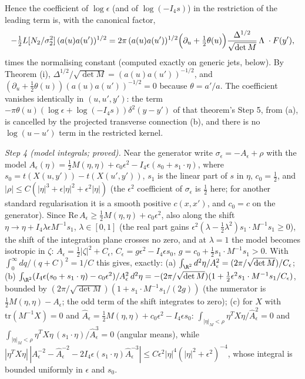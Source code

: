 Hence the coefficient of $\log\epsilon$ (and of $\log(-I_{4}s)$) in the restriction of the leading term is, with the canonical factor,
\[
-\tfrac12 L[N_{2}/\sigma_{2}^{2}]\,(a(u)a(u'))^{1/2} = 2\pi\,(a(u)a(u'))^{1/2}\Bigl(\partial_{u} + \tfrac12\theta(u)\Bigr)\frac{\Delta^{1/2}}{\sqrt{\det M}}\,\Lambda\;\cdot F(y'),
\]
times the normalising constant (computed exactly on generic jets, below). By Theorem (i), $\Delta^{1/2}/\sqrt{\det M} = (a(u)a(u'))^{-1/2}$, and $(\partial_{u} + \tfrac12\theta(u))(a(u)a(u'))^{-1/2} = 0$ because $\theta = a'/a$. The coefficient vanishes identically in $(u, u', y')$: the term $-\pi\theta(u)(\log\epsilon + \log(-I_{4}s))\delta^{2}(y - y')$ of that theorem's Step 5, from (a), is cancelled by the projected transverse connection (b), and there is no $\log(u - u')$ term in the restricted kernel.

\emph{Step 4 (model integrals; proved).} Near the generator write $\sigma_{\epsilon} = -A_{\epsilon} + \rho$ with the model $A_{\epsilon}(\eta) = \tfrac12 M(\eta, \eta) + c_{0}\epsilon^{2} - I_{4}\epsilon(s_{0} + s_{1}\cdot\eta)$, where $s_{0} = t(X(u, y')) - t(X(u', y'))$, $s_{1}$ is the linear part of $s$ in $\eta$, $c_{0} = \tfrac12$, and $|\rho| \le C(|\eta|^{3} + \epsilon|\eta|^{2} + \epsilon^{2}|\eta|)$ (the $\epsilon^{2}$ coefficient of $\sigma_{\epsilon}$ is $\tfrac12$ here; for another standard regularisation it is a smooth positive $c(x, x')$, and $c_{0} = c$ on the generator). Since $\mathrm{Re}\,A_{\epsilon} \ge \tfrac12 M(\eta, \eta) + c_{0}\epsilon^{2}$, also along the shift $\eta \to \eta + I_{4}\lambda\epsilon M^{-1}s_{1}$, $\lambda \in [0, 1]$ (the real part gains $\epsilon^{2}(\lambda - \tfrac12\lambda^{2})s_{1}\cdot M^{-1}s_{1} \ge 0$), the shift of the integration plane crosses no zero, and at $\lambda = 1$ the model becomes isotropic in $\zeta$: $A_{\epsilon} = \tfrac12|\zeta|^{2} + C_{\epsilon}$, $C_{\epsilon} = g\epsilon^{2} - I_{4}\epsilon s_{0}$, $g = c_{0} + \tfrac12 s_{1}\cdot M^{-1}s_{1} > 0$. With $\int_{0}^{\infty}dq/(q + C)^{2} = 1/C$ this gives, exactly:
(a) $\int_{\R^{2}}d^{2}\eta/A_{\epsilon}^{2} = (2\pi/\sqrt{\det M})/C_{\epsilon}$;
(b) $\int_{\R^{2}}(I_{4}\epsilon(s_{0} + s_{1}\cdot\eta) - c_{0}\epsilon^{2})/A_{\epsilon}^{2}\,d^{2}\eta = -(2\pi/\sqrt{\det M})(1 + \tfrac12\epsilon^{2}s_{1}\cdot M^{-1}s_{1}/C_{\epsilon})$, bounded by $(2\pi/\sqrt{\det M})(1 + s_{1}\cdot M^{-1}s_{1}/(2g))$ (the numerator is $\tfrac12 M(\eta, \eta) - A_{\epsilon}$; the odd term of the shift integrates to zero);
(c) for $X$ with $\mathrm{tr}(M^{-1}X) = 0$ and $\hat A_{\epsilon} = \tfrac12 M(\eta, \eta) + c_{0}\epsilon^{2} - I_{4}\epsilon s_{0}$: $\int_{|\eta|_{M} < \rho}\eta^{T}X\eta/\hat A_{\epsilon}^{2} = 0$ and $\int_{|\eta|_{M} < \rho}\eta^{T}X\eta\,(s_{1}\cdot\eta)/\hat A_{\epsilon}^{3} = 0$ (angular means), while $|\eta^{T}X\eta|\,|A_{\epsilon}^{-2} - \hat A_{\epsilon}^{-2} - 2I_{4}\epsilon(s_{1}\cdot\eta)\hat A_{\epsilon}^{-3}| \le C\epsilon^{2}|\eta|^{4}(|\eta|^{2} + \epsilon^{2})^{-4}$, whose integral is bounded uniformly in $\epsilon$ and $s_{0}$.

